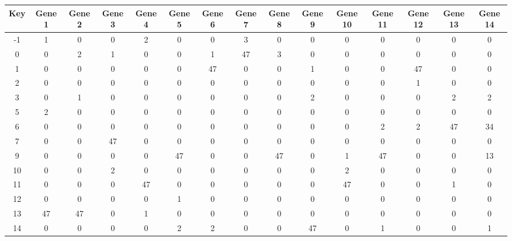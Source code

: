 \begin{tabular}{|c|c|c|c|c|c|c|c|c|c|c|c|c|c|c|}
\hline
Key & Gene 1 & Gene 2 & Gene 3 & Gene 4 & Gene 5 & Gene 6 & Gene 7 & Gene 8 & Gene 9 & Gene 10 & Gene 11 & Gene 12 & Gene 13 & Gene 14 \\
\hline
-1 & 1 & 0 & 0 & 2 & 0 & 0 & 3 & 0 & 0 & 0 & 0 & 0 & 0 & 0 \\
0 & 0 & 2 & 1 & 0 & 0 & 1 & 47 & 3 & 0 & 0 & 0 & 0 & 0 & 0 \\
1 & 0 & 0 & 0 & 0 & 0 & 47 & 0 & 0 & 1 & 0 & 0 & 47 & 0 & 0 \\
2 & 0 & 0 & 0 & 0 & 0 & 0 & 0 & 0 & 0 & 0 & 0 & 1 & 0 & 0 \\
3 & 0 & 1 & 0 & 0 & 0 & 0 & 0 & 0 & 2 & 0 & 0 & 0 & 2 & 2 \\
5 & 2 & 0 & 0 & 0 & 0 & 0 & 0 & 0 & 0 & 0 & 0 & 0 & 0 & 0 \\
6 & 0 & 0 & 0 & 0 & 0 & 0 & 0 & 0 & 0 & 0 & 2 & 2 & 47 & 34 \\
7 & 0 & 0 & 47 & 0 & 0 & 0 & 0 & 0 & 0 & 0 & 0 & 0 & 0 & 0 \\
9 & 0 & 0 & 0 & 0 & 47 & 0 & 0 & 47 & 0 & 1 & 47 & 0 & 0 & 13 \\
10 & 0 & 0 & 2 & 0 & 0 & 0 & 0 & 0 & 0 & 2 & 0 & 0 & 0 & 0 \\
11 & 0 & 0 & 0 & 47 & 0 & 0 & 0 & 0 & 0 & 47 & 0 & 0 & 1 & 0 \\
12 & 0 & 0 & 0 & 0 & 1 & 0 & 0 & 0 & 0 & 0 & 0 & 0 & 0 & 0 \\
13 & 47 & 47 & 0 & 1 & 0 & 0 & 0 & 0 & 0 & 0 & 0 & 0 & 0 & 0 \\
14 & 0 & 0 & 0 & 0 & 2 & 2 & 0 & 0 & 47 & 0 & 1 & 0 & 0 & 1 \\
\hline
\end{tabular}